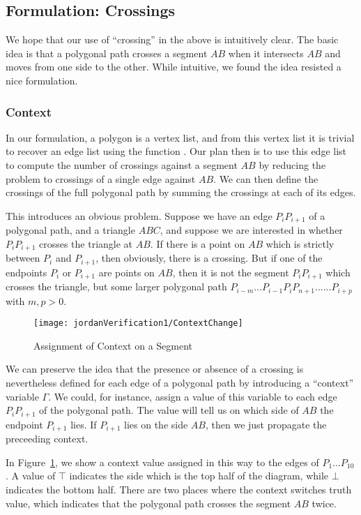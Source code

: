 \subsection{Formulation: Crossings}
We hope that our use of ``crossing'' in the above is intuitively clear. The basic idea is that a polygonal path crosses a segment $AB$ when it intersects $AB$ and moves from one side to the other. While intuitive, we found the idea resisted a nice formulation.

\subsubsection{Context}
In our formulation, a polygon is a vertex list, and from this vertex list it is trivial to recover an edge list using the function . Our plan then is to use this edge list to compute the number of crossings against a segment $AB$ by reducing the problem to crossings of a single edge against $AB$. We can then define the crossings of the full polygonal path by summing the crossings at each of its edges. 

This introduces an obvious problem. Suppose we have an edge $P_iP_{i+1}$ of a polygonal path, and a triangle $ABC$, and suppose we are interested in whether $P_iP_{i+1}$ crosses the triangle at $AB$. If there is a point on $AB$ which is strictly between $P_i$ and $P_{i+1}$, then obviously, there is a crossing. But if one of the endpoints $P_{i}$ or $P_{i+1}$ are points on $AB$, then it is not the segment $P_iP_{i+1}$ which crosses the triangle, but some larger polygonal path $P_{i-m}\ldots P_{i-1}P_iP_{n+1}\ldots...P_{i+p}$ with $m,p > 0$. 

\begin{figure}
\centering\texttt{[image: jordanVerification1/ContextChange]}
\caption{Assignment of Context on a Segment}
\label{fig:ContextChanges}
\end{figure}

We can preserve the idea that the presence or absence of a crossing is nevertheless defined for each edge of a polygonal path by introducing a  ``context'' variable $\Gamma$. We could, for instance, assign a value of this variable to each edge $P_iP_{i+1}$ of the polygonal path. The value will tell us on which side of $AB$ the endpoint $P_{i+1}$ lies. If $P_{i+1}$ lies on the side $AB$, then we just propagate the preceeding context.

In Figure~\ref{fig:ContextChanges}, we show a context value assigned in this way to the edges of $P_1\ldots P_{10}$. A value of $\top$ indicates the side which is the top half of the diagram, while $\bot$ indicates the bottom half. There are two places where the context switches truth value, which indicates that the polygonal path crosses the segment $AB$ twice.

